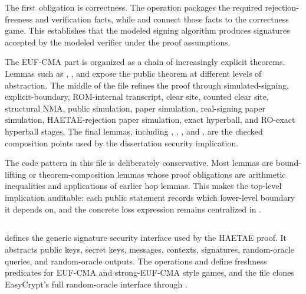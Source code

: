 The first obligation is correctness.  The operation
 packages the required rejection-freeness and
verification facts, while  and
 connect those facts to the correctness game.  This
establishes that the modeled signing algorithm produces signatures accepted by
the modeled verifier under the proof assumptions.

The EUF-CMA part is organized as a chain of increasingly explicit theorems.
Lemmas such as ,
, and
 expose the public theorem at
different levels of abstraction.  The middle of the file refines the proof
through simulated-signing, explicit-boundary, ROM-internal transcript, clear
site, counted clear site, structural NMA, public simulation, paper simulation,
real-signing paper simulation, HAETAE-rejection paper simulation, exact
hyperball, and RO-exact hyperball stages.  The final lemmas, including
,
,
,
and
,
are the checked composition points used by the dissertation security
implication.

The code pattern in this file is deliberately conservative.  Most lemmas are
bound-lifting or theorem-composition lemmas whose proof obligations are
arithmetic inequalities and applications of earlier hop lemmas.  This makes the
top-level implication auditable: each public statement records which lower-level
boundary it depends on, and the concrete loss expression remains centralized in
.

\subsection[Sig\_ROM.ec]{\texorpdfstring{}{Sig\_ROM.ec}}

 defines the generic signature security interface used by
the HAETAE proof.  It abstracts public keys, secret keys, messages, contexts,
signatures, random-oracle queries, and random-oracle outputs.  The operations
 and  define freshness predicates for
EUF-CMA and strong-EUF-CMA style games, and the file clones EasyCrypt's full
random-oracle interface through .


